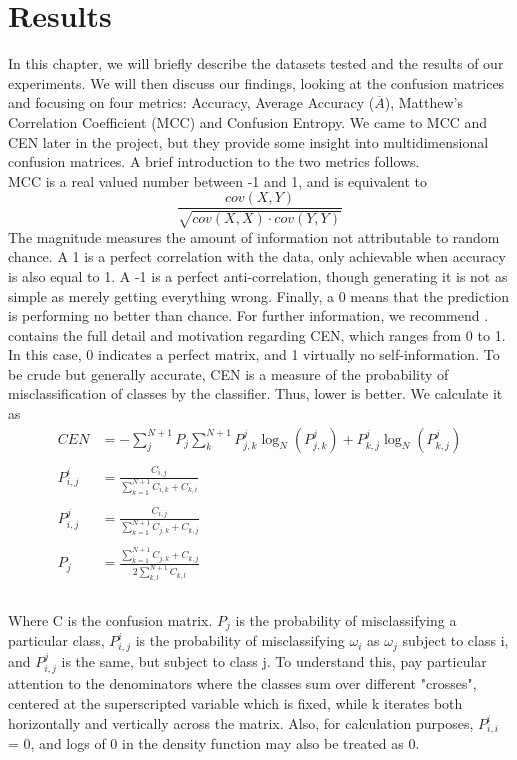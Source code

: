 \chapter{Results}\label{ch:results}
In this chapter, we will briefly describe the datasets tested and the results of our experiments.  We will then discuss our findings, looking at the confusion matrices and focusing on four metrics: Accuracy, Average Accuracy ($\overline{A}$), Matthew's Correlation Coefficient (MCC) and Confusion Entropy.  We came to MCC and CEN later in the project, but they provide some insight into multidimensional confusion matrices.  A brief introduction to the two metrics follows.\\
MCC is a real valued number between -1 and 1, and is equivalent to $$\frac{cov(X,Y)}{\sqrt{cov(X,X)\cdot cov(Y,Y)}}$$
The magnitude measures the amount of information not attributable to random chance.  A 1 is a perfect correlation with the data, only achievable when accuracy is also equal to 1.  A -1 is a perfect anti-correlation, though generating it is not as simple as merely getting everything wrong.  Finally, a 0 means that the prediction is performing no better than chance.  For further information, we recommend \cite{jurman_comparison_2012}.\\
\cite{wei_novel_2010} contains the full detail and motivation regarding CEN, which ranges from 0 to 1.  In this case, 0 indicates a perfect matrix, and 1 virtually no self-information.  To be crude but generally accurate, CEN is a measure of the probability of misclassification of classes by the classifier.  Thus, lower is better. We calculate it as\\
 \begin{align*}
CEN &= - \sum_{j}^{N+1}P_j\sum_{k}^{N+1}P^j_{j,k}\log_N(P^j_{j,k}) + P^j_{k,j}\log_N(P^j_{k,j})\\
\\
P^i_{i,j}&=\frac{C_{i,j}}{\sum_{k=1}^{N+1}C_{i,k} + C_{k,i}}\\
\\
P^j_{i,j}&=\frac{C_{i,j}}{\sum_{k=1}^{N+1}C_{j,k} + C_{k,j}}\\
\\
P_j&= \frac{\sum_{k=1}^{N+1}C_{j,k}+ C_{k,j}}{2\sum_{k,l}^{N+1}C_{k,l}}\\	
\end{align*}	\\Where C is the confusion matrix.  $P_j$ is the probability of misclassifying a particular class, $P^i_{i,j}$ is the probability of misclassifying $\omega_i$ as $\omega_j$ subject to class i, and $P^j_{i,j}$ is the same, but subject to class j.  To understand this, pay particular attention to the denominators where the classes sum over different "crosses", centered at the superscripted variable which is fixed, while k iterates both horizontally and vertically across the matrix.  Also, for calculation purposes, $P^i_{i,i}$ = 0, and logs of 0 in the density function may also be treated as 0.  

